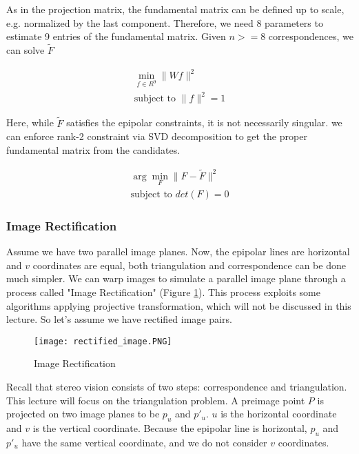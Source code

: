 \documentclass[twoside]{article}
\begin{document}
As in the projection matrix, the fundamental matrix can be defined up to scale, e.g. normalized by the last component. Therefore, we need 8 parameters to estimate 9 entries of the fundamental matrix. Given $n>=8$ correspondences, we can solve $\tilde{F}$

\begin{align}
\min_{f\in{R^9}}\|Wf\|^2 \\
\text{subject to } \|f\|^2 = 1
\end{align}

Here, while $\tilde{F}$ satisfies the epipolar constraints, it is not necessarily singular. we can enforce rank-2 constraint via SVD decomposition to get the proper fundamental matrix from the candidates.

\begin{align}
\arg\!\min_F \|F-\tilde{F}\|^2 \\
\text{subject to } det(F) = 0
\end{align}

\subsubsection{Image Rectification}

Assume we have two parallel image planes. Now, the epipolar lines are horizontal and $v$ coordinates are equal, both triangulation and correspondence can be done much simpler. We can warp images to simulate a parallel image plane through a process called "Image Rectification" (Figure \ref{rect}). This process exploits some algorithms applying projective transformation, which will not be discussed in this lecture. So let's assume we have rectified image pairs.

\begin{figure}[h!]
  \begin{center}
	\texttt{[image: rectified\_image.PNG]}  \end{center}
  \caption{Image Rectification}
  \label{rect}
\end{figure}

Recall that stereo vision consists of two steps: correspondence and triangulation. This lecture will focus on the triangulation problem. A preimage point $P$ is projected on two image planes to be $p_u$ and $p'_u$. $u$ is the horizontal coordinate and $v$ is the vertical coordinate. Because the epipolar line is horizontal, $p_u$ and $p'_u$ have the same vertical coordinate, and we do not consider $v$ coordinates.
\end{document}
